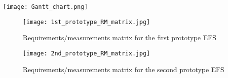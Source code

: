 \documentclass[11pt,twoside,a4paper,openright]{report}
\begin{document}
\begin{comment}
\winsec{Planning Update: }{}
\vspace{12pt}
The EFS project is currently ahead of the milestone schedule anticipated in our 2/14/17 project plan, particularly for milestones involving the first water pumping prototype. First prototype testing was initially planned by 5/6/17 with data analysis completed by 5/22/17, but those milestones are currently expected to be completed three to four weeks early. This is unlikely to affect milestones involving the second, liquid oxygen pumping prototype, as the results of the first prototype test will determine whether additional design-test iteration of the first prototype will be needed to validate our theory and design before proceeding with the more challenging, liquid oxygen pumping second prototype. Being ahead of schedule is small relief given the daunting challenges of the final prototype’s requirements. Please see the updated Gantt chart in the appendix.\par




\end{comment}
\newpage
{}

\begin{center}
\texttt{[image: Gantt\_chart.png]}
\end{center}





\setcounter{figure}{0} \renewcommand{\thefigure}{A.\arabic{figure}}

\begin{figure}[!h]
\begin{center}
\texttt{[image: 1st\_prototype\_RM\_matrix.jpg]}
\caption{Requirements/measurements matrix for the first prototype EFS}
\end{center}
\end{figure}
\newpage
\begin{figure}[!h]
\begin{center}
\texttt{[image: 2nd\_prototype\_RM\_matrix.jpg]}
\caption{Requirements/measurements matrix for the second prototype EFS}
\end{center}
\end{figure}
\end{document}
